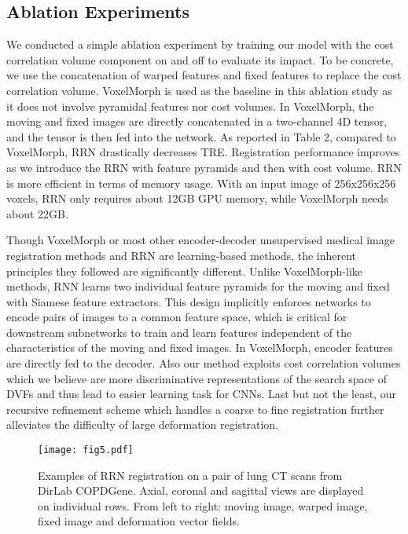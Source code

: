 \documentclass[runningheads]{llncs}
\begin{document}
\subsection{Ablation Experiments}

We conducted a simple ablation experiment by training our model with the cost correlation volume component on and off to evaluate its impact. To be concrete, we use the concatenation of warped features and fixed features to replace the cost correlation volume. VoxelMorph is used  as the baseline in this ablation study as it does not involve pyramidal features nor cost volumes. In VoxelMorph, the moving and fixed images are directly concatenated in a two-channel 4D tensor, and  the tensor is then fed into the network. As reported in Table 2, compared to VoxelMorph, RRN drastically decreases TRE. Registration performance improves as we introduce the RRN with feature pyramids and then with cost volume. RRN is more efficient in terms of memory usage. With an input image of 256x256x256 voxels, RRN only requires about 12GB GPU memory, while VoxelMorph needs about 22GB.

Though VoxelMorph or most other encoder-decoder  unsupervised medical image registration methods and RRN are learning-based methods, the inherent principles they followed are significantly different. Unlike VoxelMorph-like methods, RNN learns two individual feature pyramids for the moving and fixed with Siamese feature extractors. This design implicitly enforces networks to encode  pairs of images to a common feature space, which is critical for downstream subnetworks to train and learn features independent of the characteristics of the moving and fixed images. In VoxelMorph, encoder features are directly fed to the decoder. Also our method exploits cost correlation volumes which we believe are more discriminative representations of the search space of DVFs and thus lead to easier learning task for CNNs. Last but not the least, our recursive refinement scheme which handles a coarse to fine registration further alleviates the difficulty of large deformation registration. 


\begin{figure}[t]
\texttt{[image: fig5.pdf]}
\caption{Examples of RRN registration on a pair of lung CT scans from DirLab COPDGene. Axial, coronal and sagittal views are displayed on individual rows. From left to right: moving image, warped image, fixed image and deformation vector fields.}\label{fig4}
\end{figure}
\end{document}
